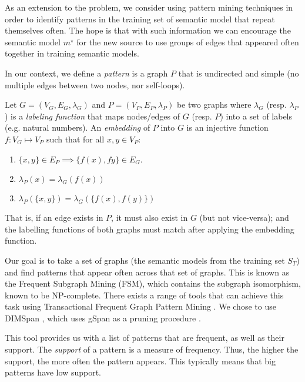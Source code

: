 \documentclass[letterpaper]{article} %
\newcommand{\authornote}[3]{
  {\fbox{\sc 
  #1}:$\blacktriangleright$\textcolor{#2}{\small{#3}}$\blacktriangleleft$}%
}
\newcommand{\ddg}[1]{\authornote{DDG}{blue}{#1}}
\newcommand{\npr}[1]{\authornote{NPR}{orange}{#1}}
\begin{document}
As an extension to the problem, we consider using pattern mining techniques in order to identify patterns in the training set of semantic model that repeat themselves often. 
The hope is that with such information we can encourage the semantic model $m^\star$ for the new source to use groups of edges that                                       appeared often together in training semantic models.

In our context, we define a \emph{pattern} is a graph $P$ that is undirected 
and simple (no multiple edges between two nodes, nor self-loops).

Let $G = (V_G,E_G,\lambda_G)$ and $P = (V_P,E_P, \lambda_P)$ be two graphs 
where $\lambda_G$ (resp. $\lambda_P$) is a \emph{labeling function} that maps 
nodes/edges of $G$ (resp. $P$) into a set of labels (e.g. natural numbers).
An \emph{embedding} of $P$ into $G$ is an injective function $f : V_G \mapsto 
V_P$ such that for all $x,y \in V_P$:
\begin{enumerate}
	\item $\{x,y\} \in E_P \implies \{f(x),f{y}\} \in E_G$.
	\item $\lambda_P(x) = \lambda_G(f(x))$
	\item $\lambda_P(\{x,y\}) = \lambda_G(\{f(x),f(y)\})$
\end{enumerate} 
That is, if an edge exists in $P$, it must also exist in $G$ (but not 
vice-versa); and the labelling functions of both graphs must match after 
applying the embedding function.

Our goal is to take a set of graphs (the semantic models from the training set 
$S_T$) and find patterns that appear often across that set of graphs. This is 
known as the Frequent Subgraph Mining (FSM), which contains the subgraph 
isomorphism, known to be NP-complete. 
There exists a range of tools that can achieve this task using Transactional 
Frequent Graph Pattern Mining \cite{petermann2017dimspan,yan2002gspan}. 
We chose to use DIMSpan \cite{petermann2017dimspan}, which uses gSpan as a 
pruning procedure \cite{yan2002gspan}.

This tool provides us with a list of patterns that are frequent, as well as 
their support. 
The \emph{support} of a pattern is a measure of frequency. 
Thus, the higher the support, the more often the pattern appears. This typically means that big patterns have low support.
\end{document}
